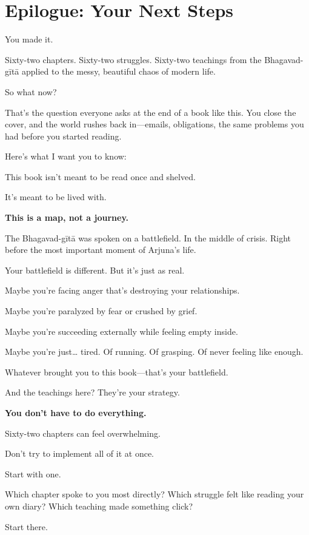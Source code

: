 \documentclass[11pt,twoside]{book}
\begin{document}
\backmatter

\chapter*{Epilogue: Your Next Steps}

You made it.

Sixty-two chapters. Sixty-two struggles. Sixty-two teachings from the Bhagavad-gītā applied to the messy, beautiful chaos of modern life.

So what now?

That's the question everyone asks at the end of a book like this. You close the cover, and the world rushes back in—emails, obligations, the same problems you had before you started reading.

Here's what I want you to know:

This book isn't meant to be read once and shelved.

It's meant to be lived with.

\textbf{\textbf{This is a map, not a journey.}}

The Bhagavad-gītā was spoken on a battlefield. In the middle of crisis. Right before the most important moment of Arjuna's life.

Your battlefield is different. But it's just as real.

Maybe you're facing anger that's destroying your relationships.

Maybe you're paralyzed by fear or crushed by grief.

Maybe you're succeeding externally while feeling empty inside.

Maybe you're just\ldots{} tired. Of running. Of grasping. Of never feeling like enough.

Whatever brought you to this book—that's your battlefield.

And the teachings here? They're your strategy.

\textbf{\textbf{You don't have to do everything.}}

Sixty-two chapters can feel overwhelming.

Don't try to implement all of it at once.

Start with one.

Which chapter spoke to you most directly? Which struggle felt like reading your own diary? Which teaching made something click?

Start there.
\end{document}
